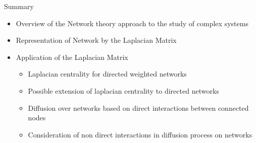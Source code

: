 \documentclass{beamer}
\begin{document}
\begin{frame}{Summary}
	\begin{itemize}
		\item Overview of the Network theory approach to the study of complex systems
		\item Representation of Network by the Laplacian Matrix
		\item Application of the Laplacian Matrix 
		\begin{itemize}
			\item Laplacian centrality for directed weighted networks 
			\item  Possible extension of laplacian centrality to directed networks
			\item Diffusion over networks based on direct interactions between connected nodes
			\item Consideration of non direct interactions in diffusion process on networks
			
		\end{itemize}
	\end{itemize}
	
\end{frame}




%	
%	
%	

\end{document}
